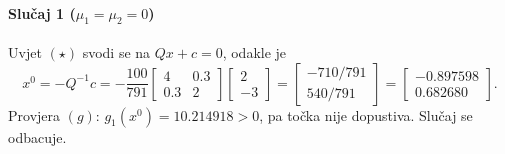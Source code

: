 \paragraph{Slučaj 1 ($\mu_1 = \mu_2 = 0$)}
Uvjet $(\star)$ svodi se na $Qx + c = 0$, odakle je
\begin{equation}
x^0 = -Q^{-1} c = -\frac{100}{791} \begin{bmatrix} 4 & 0.3 \\ 0.3 & 2 \end{bmatrix} \begin{bmatrix} 2 \\ -3 \end{bmatrix} = \begin{bmatrix} -710/791 \\ 540/791 \end{bmatrix} = \begin{bmatrix} -0.897598 \\ 0.682680 \end{bmatrix}.
\end{equation}
Provjera $(g)$: $g_1(x^0) = 10.214918 > 0$, pa točka nije dopustiva. Slučaj se odbacuje.


